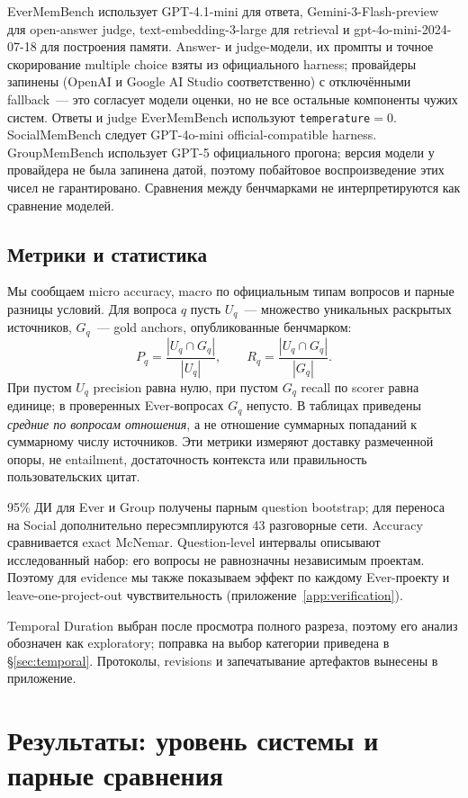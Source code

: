 \documentclass[11pt,a4paper]{article}
\begin{document}
EverMemBench использует GPT-4.1-mini для ответа, Gemini-3-Flash-preview для
open-answer judge, text-embedding-3-large для retrieval и
gpt-4o-mini-2024-07-18 для построения памяти. Answer- и judge-модели, их промпты
и точное скорирование multiple choice взяты из официального harness; провайдеры
запинены (OpenAI и Google AI Studio соответственно) с отключёнными fallback~---
это согласует модели оценки, но не все остальные компоненты чужих систем. Ответы и judge EverMemBench
используют \texttt{temperature}${}=0$. SocialMemBench следует
GPT-4o-mini official-compatible harness. GroupMemBench использует GPT-5
официального прогона; версия модели у провайдера не была запинена датой, поэтому
побайтовое воспроизведение этих чисел не гарантировано. Сравнения между бенчмарками не интерпретируются как
сравнение моделей.

\subsection{Метрики и статистика}
\label{sec:stats}

Мы сообщаем micro accuracy, macro по официальным типам вопросов и парные
разницы условий. Для вопроса $q$ пусть $U_q$~--- множество уникальных
раскрытых источников, $G_q$~--- gold anchors, опубликованные бенчмарком:
\[
P_q=\frac{|U_q\cap G_q|}{|U_q|},\qquad
R_q=\frac{|U_q\cap G_q|}{|G_q|}.
\]
При пустом $U_q$ precision равна нулю, при пустом $G_q$ recall по scorer равна
единице; в проверенных Ever-вопросах $G_q$ непусто. В таблицах приведены
\emph{средние по вопросам отношения}, а не отношение суммарных попаданий
к суммарному числу источников. Эти метрики измеряют доставку размеченной опоры,
не entailment, достаточность контекста или правильность пользовательских цитат.

95\% ДИ для Ever и Group получены парным question bootstrap; для переноса на
Social дополнительно пересэмплируются 43 разговорные сети. Accuracy
сравнивается exact McNemar. Question-level интервалы описывают исследованный
набор: его вопросы не равнозначны независимым проектам. Поэтому для evidence
мы также показываем эффект по каждому Ever-проекту и leave-one-project-out
чувствительность (приложение~\ref{app:verification}).

Temporal Duration выбран после просмотра полного разреза, поэтому его анализ
обозначен как exploratory; поправка на выбор категории приведена в
§\ref{sec:temporal}. Протоколы, revisions и запечатывание артефактов вынесены в
приложение.

\section{Результаты: уровень системы и парные сравнения}
\end{document}
